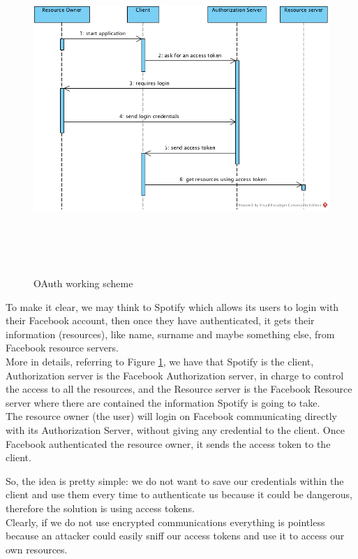 \documentclass[12pt]{report}
\begin{document}
{{\begin{figure}[H]
\includegraphics[width=12.5cm,height=12.5cm,keepaspectratio]{oauth_scheme}
\centering
\caption{OAuth working scheme}
\label{fig:oauthscheme}
\end{figure}

To make it clear, we may think to Spotify which allows its users to login with their Facebook account, then once they have authenticated, it gets their information (resources), like name, surname and maybe something else, from Facebook resource servers.\\
More in details, referring to Figure \ref{fig:oauthscheme}, we have that Spotify is the client, Authorization server is the Facebook Authorization server, in charge to control the access to all the resources, and the Resource server is the Facebook Resource server where there are contained the information Spotify is going to take.\\
The resource owner (the user) will login on Facebook communicating directly with its Authorization Server, without giving any credential to the client. Once Facebook authenticated the resource owner, it sends the access token to the client.

So, the idea is pretty simple: we do not want to save our credentials within the client and use them every time to authenticate us because it could be dangerous, therefore the solution is using access tokens.\\
Clearly, if we do not use encrypted communications everything is pointless because an attacker could easily sniff our access tokens and use it to access our own resources.\\

}}
\end{document}
